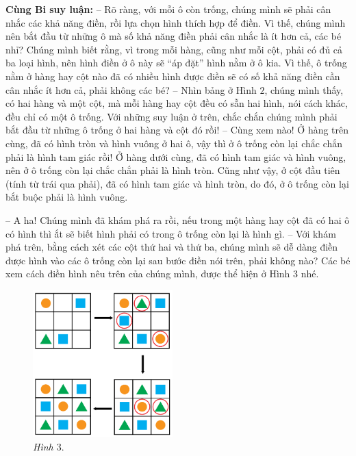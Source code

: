 	\textbf{Cùng Bi suy luận:}
	\vskip 0.15cm
	-- Rõ ràng, với mỗi ô còn trống, chúng mình sẽ phải cân nhắc các khả năng điền, rồi lựa chọn hình thích hợp để điền. Vì thế, chúng mình nên bắt đầu từ những ô mà số khả năng điền phải cân nhắc là ít hơn cả, các bé nhỉ? Chúng mình biết rằng, vì trong mỗi hàng, cũng như mỗi cột, phải có đủ cả ba loại hình, nên hình điền ở ô này sẽ “áp đặt” hình nằm ở ô kia. Vì thế, ô trống nằm ở hàng hay cột nào đã có nhiều hình được điền sẽ có số khả năng điền cần cân nhắc ít hơn cả, phải không các bé?
	\vskip 0.15cm
	-- Nhìn bảng ở Hình $2$, chúng mình thấy, có hai hàng và một cột, mà mỗi hàng hay cột đều có sẵn hai hình, nói cách khác, đều chỉ có một ô trống. Với những suy luận ở trên, chắc chắn chúng mình phải bắt đầu từ những ô trống ở hai hàng và cột đó rồi!
	\vskip 0.15cm
	-- Cùng xem nào! Ở hàng trên cùng, đã có hình tròn và hình vuông ở hai ô, vậy thì ở ô trống còn lại chắc chắn phải là hình tam giác rồi! Ở hàng dưới cùng, đã có hình tam giác và hình vuông, nên ở ô trống còn lại chắc chắn phải là hình tròn. Cũng như vậy, ở cột đầu tiên (tính từ trái qua phải), đã có hình tam giác và hình tròn, do đó, ở ô trống còn lại bắt buộc phải là hình vuông.
	\vskip 0.15cm
	\begin{multicols}{2}
			-- A ha! Chúng mình đã khám phá ra rồi, nếu trong một hàng hay cột đã có hai ô có hình thì ắt sẽ biết hình phải có trong ô trống còn lại là hình gì.
		\vskip 0.15cm
		-- Với khám phá trên, bằng cách xét các cột thứ hai và thứ ba, chúng mình sẽ dễ dàng điền được hình vào các ô trống còn lại sau bước điền nói trên, phải không nào?
		\vskip 0.15cm
		Các bé xem cách điền hình nêu trên của chúng mình, được thể hiện ở Hình $3$ nhé.
		\vskip 0.15cm
		\begin{figure}[H]
			\centering
			\vspace*{-10pt}
			\captionsetup{labelformat= empty, justification=centering}
			\includegraphics[width=0.48\textwidth]{hinh3}
			\caption{\small\textit{Hình $3.$}}
			\vspace*{-5pt}
		\end{figure}
	\end{multicols}
